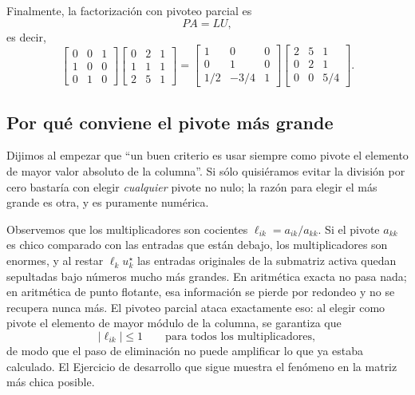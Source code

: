 Finalmente, la factorización con pivoteo parcial es
\[
PA = LU,
\]
es decir,
\[
\begin{bmatrix}
0 & 0 & 1 \\
1 & 0 & 0 \\
0 & 1 & 0
\end{bmatrix}
\begin{bmatrix}
0 & 2 & 1 \\
1 & 1 & 1 \\
2 & 5 & 1
\end{bmatrix}
=
\begin{bmatrix}
1 & 0 & 0 \\
0 & 1 & 0 \\
1/2 & -3/4 & 1
\end{bmatrix}
\begin{bmatrix}
2 & 5 & 1 \\
0 & 2 & 1 \\
0 & 0 & 5/4
\end{bmatrix}.
\]



\subsection{Por qué conviene el pivote más grande}

Dijimos al empezar que ``un buen criterio es usar siempre como pivote el
elemento de mayor valor absoluto de la columna''. Si sólo quisiéramos evitar la
división por cero bastaría con elegir \emph{cualquier} pivote no nulo; la razón
para elegir el más grande es otra, y es puramente numérica.

Observemos que los multiplicadores son cocientes $\ell_{ik} = a_{ik}/a_{kk}$. Si
el pivote $a_{kk}$ es chico comparado con las entradas que están debajo, los
multiplicadores son enormes, y al restar $\ell_k u_k^\star$ las entradas
originales de la submatriz activa quedan sepultadas bajo números mucho más
grandes. En aritmética exacta no pasa nada; en aritmética de punto flotante, esa
información se pierde por redondeo y no se recupera nunca más. El pivoteo
parcial ataca exactamente eso: al elegir como pivote el elemento de mayor módulo
de la columna, se garantiza que
\[
|\ell_{ik}| \le 1 \qquad\text{para todos los multiplicadores},
\]
de modo que el paso de eliminación no puede amplificar lo que ya estaba
calculado. El Ejercicio de desarrollo que sigue muestra el fenómeno en la
matriz más chica posible.

